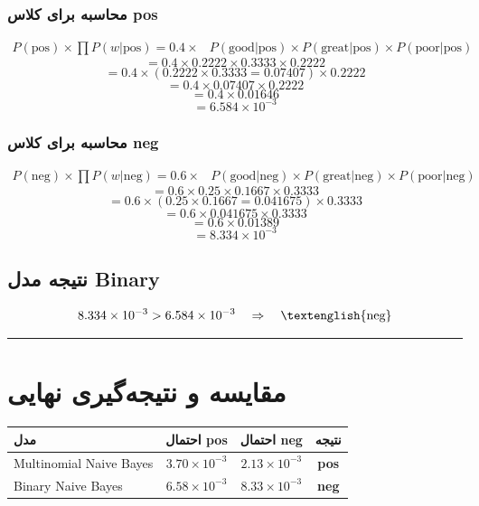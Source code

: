 \documentclass[11pt,a4paper]{article}
\newcommand{\en}[1]{\textenglish{#1}}
\newcommand{\separator}{\vspace{1em}\noindent\rule{\linewidth}{0.4pt}\vspace{1em}}
\begin{document}
\subsubsection*{محاسبه برای کلاس \en{pos}}
\[
\begin{aligned}
P(\text{pos}) \times \prod P(w|\text{pos}) = 0.4 \times & P(\text{good}|\text{pos}) \times P(\text{great}|\text{pos}) \times P(\text{poor}|\text{pos})
\end{aligned}
\]
\[
= 0.4 \times 0.2222 \times 0.3333 \times 0.2222
\]
\[
= 0.4 \times (0.2222 \times 0.3333 = 0.07407) \times 0.2222
\]
\[
= 0.4 \times 0.07407 \times 0.2222
\]
\[
= 0.4 \times 0.01646
\]
\[
= 6.584 \times 10^{-3}
\]

\subsubsection*{محاسبه برای کلاس \en{neg}}
\[
\begin{aligned}
P(\text{neg}) \times \prod P(w|\text{neg}) = 0.6 \times & P(\text{good}|\text{neg}) \times P(\text{great}|\text{neg}) \times P(\text{poor}|\text{neg})
\end{aligned}
\]
\[
= 0.6 \times 0.25 \times 0.1667 \times 0.3333
\]
\[
= 0.6 \times (0.25 \times 0.1667 = 0.041675) \times 0.3333
\]
\[
= 0.6 \times 0.041675 \times 0.3333
\]
\[
= 0.6 \times 0.01389
\]
\[
= 8.334 \times 10^{-3}
\]

\subsection*{نتیجه مدل \en{Binary}}
\[
8.334 \times 10^{-3} > 6.584 \times 10^{-3} \quad \Rightarrow \quad \text{\en{neg}}
\]

\separator
\section{مقایسه و نتیجه‌گیری نهایی}
\begin{center}
\begin{tabular}{|l|c|c|c|}
\hline
\textbf{مدل} & \textbf{احتمال \en{pos}} & \textbf{احتمال \en{neg}} & \textbf{نتیجه} \\
\hline
\en{Multinomial Naive Bayes} & $3.70 \times 10^{-3}$ & $2.13 \times 10^{-3}$ & \textbf{\en{pos}} \\
\hline
\en{Binary Naive Bayes} & $6.58 \times 10^{-3}$ & $8.33 \times 10^{-3}$ & \textbf{\en{neg}} \\
\hline
\end{tabular}
\end{center}
\end{document}
